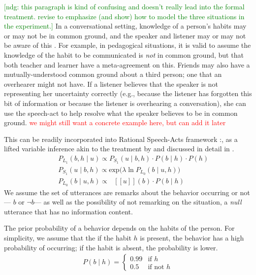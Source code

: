 \documentclass[10pt,letterpaper]{article}
\newcommand{\denote}[1]{\mbox{ $[\![ #1 ]\!]$}}
\newcommand{\red}[1]{\textcolor{Red}{#1}}
\newcommand{\ndg}[1]{\textcolor{Green}{[ndg: #1]}}
\begin{document}
\ndg{this paragraph is kind of confusing and doesn't really lead into the formal treatment. revise to emphasize (and show) how to model the three situations in the experiment.}
In a conversational setting, knowledge of a person's habits may or may not be in common ground, and the speaker and listener may or may not be aware of this \cite{Clark1977, Clark1996}. 
For example, in pedagogical situations, it is valid to assume the knowledge of the habit to be communicated is \emph{not} in common ground, but that both teacher and learner have a meta-agreement on this.
Friends may also have a mutually-understood common ground about a third person; one that an overhearer might not have. 
If a listener believes that the speaker is not representing her uncertainty correctly (e.g., because the listener has forgotten this bit of information or because the listener is overhearing a conversation), she can use the speech-act to help resolve what the speaker believes to be in common ground. 
\red{we might still want a concrete example here, but can add it later}

This can be readily incorporated into Rational Speech-Acts framework \cite{Frank2012, Goodman2013}:, as a lifted variable inference akin to the treatment by  and discussed in detail in .
%
\begin{eqnarray}
&&P_{L_1}(b, h \mid u)\propto P_{S_1}(u \mid b, h)\cdot P(b \mid h) \cdot P(h) \label{eq:L1}\\
&&P_{S_1}(u \mid b, h) \propto \mathrm{exp}({\lambda \ln P_{L_0}(b \mid u, h))} \label{eq:S1}\\
&&P_{L_0}(b \mid u, h)\propto \denote{u}(b) \cdot P(b \mid h) \label{eq:L0}
\end{eqnarray}
%
We assume the set of utterances are remarks about the behavior occurring or not --- $b$ or $\neg b$--- as well as the possibility of not remarking on the situation, a \emph{null} utterance that has no information content.  

The prior probability of a behavior depends on the habits of the person. For simplicity, we assume that the if the habit $h$ is present, the behavior has a high probability of occurring; if the habit is absent, the probability is lower. 
\begin{eqnarray}
P(b \mid h) = \begin{cases}
0.99  & \text{if } h\\
0.5  & \text{if not } h
\end{cases} \label{eq:hab}
\end{eqnarray}
\end{document}
